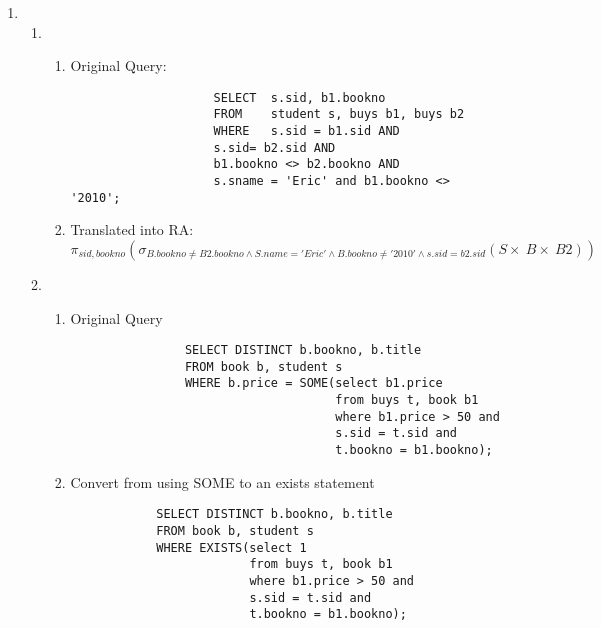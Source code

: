 \documentclass{article}
\begin{document}
\begin{enumerate}
    \item %
        \begin{enumerate}
        \item %
        \begin{enumerate}
                \item Original Query:
                \begin{lstlisting}
                    SELECT  s.sid, b1.bookno
                    FROM    student s, buys b1, buys b2
                    WHERE   s.sid = b1.sid AND
                    s.sid= b2.sid AND
                    b1.bookno <> b2.bookno AND
                    s.sname = 'Eric' and b1.bookno <> '2010';
                \end{lstlisting}

                \item Translated into RA:
                \begin{displaymath}
                    \pi_{sid, bookno}
                        (\sigma_{B.bookno \ne B2.bookno \wedge S.name='Eric' \wedge B.bookno \ne '2010' \wedge s.sid=b2.sid}
                            (S \times\ B \times\ B2))
                \end{displaymath}

        \end{enumerate}

        \item %
        \begin{enumerate}

            \item Original Query
            \begin{lstlisting}
                SELECT DISTINCT b.bookno, b.title
                FROM book b, student s
                WHERE b.price = SOME(select b1.price
                                     from buys t, book b1
                                     where b1.price > 50 and
                                     s.sid = t.sid and
                                     t.bookno = b1.bookno);
            \end{lstlisting}

            \item Convert from using SOME to an exists statement
            \begin{lstlisting}
            SELECT DISTINCT b.bookno, b.title
            FROM book b, student s
            WHERE EXISTS(select 1
                         from buys t, book b1
                         where b1.price > 50 and
                         s.sid = t.sid and
                         t.bookno = b1.bookno);
            \end{lstlisting}


\end{enumerate}
\end{enumerate}
\end{enumerate}
\end{document}
